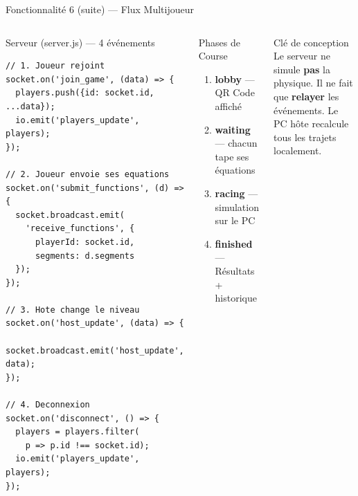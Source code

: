 \documentclass[aspectratio=169,12pt]{beamer}
\begin{document}
\begin{frame}{Fonctionnalit\'e 6 (suite) --- Flux Multijoueur}
  \begin{columns}
    \begin{block}{Serveur (server.js) --- 4 \'ev\'enements}
\begin{lstlisting}
// 1. Joueur rejoint
socket.on('join_game', (data) => {
  players.push({id: socket.id, ...data});
  io.emit('players_update', players);
});

// 2. Joueur envoie ses equations
socket.on('submit_functions', (d) => {
  socket.broadcast.emit(
    'receive_functions', {
      playerId: socket.id,
      segments: d.segments
  });
});

// 3. Hote change le niveau
socket.on('host_update', (data) => {
  socket.broadcast.emit('host_update', data);
});

// 4. Deconnexion
socket.on('disconnect', () => {
  players = players.filter(
    p => p.id !== socket.id);
  io.emit('players_update', players);
});
\end{lstlisting}
    \end{block}
    \begin{exampleblock}{Phases de Course}
      \begin{enumerate}
        \item \textbf{lobby} --- QR Code affich\'e
        \item \textbf{waiting} --- chacun tape ses \'equations
        \item \textbf{racing} --- simulation sur le PC
        \item \textbf{finished} --- R\'esultats + historique
      \end{enumerate}
    \end{exampleblock}
    \vspace{0.3cm}
    \begin{alertblock}{Cl\'e de conception}
      Le serveur ne simule \textbf{pas} la physique.
      Il ne fait que \textbf{relayer} les \'ev\'enements.
      Le PC h\^ote recalcule tous les trajets localement.
    \end{alertblock}
  \end{columns}
\end{frame}
\end{document}
